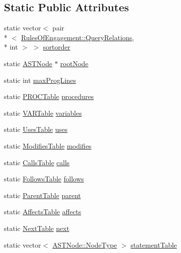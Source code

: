 \subsection*{Static Public Attributes}
\begin{DoxyCompactItemize}
\item 
static vector$<$ pair\\*
$<$ \hyperlink{class_rules_of_engagement_a5e08db2a0638b98dbb06ad923a33d817}{Rules\-Of\-Engagement\-::\-Query\-Relations}, \\*
int $>$ $>$ \hyperlink{class_p_k_b_aa0386fc54ac3aa101697cec565cd97ab}{sortorder}
\item 
static \hyperlink{class_a_s_t_node}{A\-S\-T\-Node} $\ast$ \hyperlink{class_p_k_b_a5978f3d40a8d0bb732ba708440d499b8}{root\-Node}
\item 
static int \hyperlink{class_p_k_b_ae3b310bfb545d59911cd4f6bb54ebd94}{max\-Prog\-Lines}
\item 
static \hyperlink{class_p_r_o_c_table}{P\-R\-O\-C\-Table} \hyperlink{class_p_k_b_ae426b49eef5572e594a3a465e6e462b3}{procedures}
\item 
static \hyperlink{class_v_a_r_table}{V\-A\-R\-Table} \hyperlink{class_p_k_b_a04a10fef1b34afbe28d6e217e7e11d20}{variables}
\item 
static \hyperlink{class_uses_table}{Uses\-Table} \hyperlink{class_p_k_b_aec685879d658ff43471889ddbee175a9}{uses}
\item 
static \hyperlink{class_modifies_table}{Modifies\-Table} \hyperlink{class_p_k_b_acdeea65712ec5e26401bf04ca41fa526}{modifies}
\item 
static \hyperlink{class_calls_table}{Calls\-Table} \hyperlink{class_p_k_b_a7876c3653d636ee8a726941d0f98e3ae}{calls}
\item 
static \hyperlink{class_follows_table}{Follows\-Table} \hyperlink{class_p_k_b_a93dcc37be7f8e851ff4317925c07a9f5}{follows}
\item 
static \hyperlink{class_parent_table}{Parent\-Table} \hyperlink{class_p_k_b_a92894a22bbf3b6e449f30c6bee9f070a}{parent}
\item 
static \hyperlink{class_affects_table}{Affects\-Table} \hyperlink{class_p_k_b_ad9d778faa5c6d938082d07d90da6fea0}{affects}
\item 
static \hyperlink{class_next_table}{Next\-Table} \hyperlink{class_p_k_b_a72e85289ddb59ff230cc7aace31826b5}{next}
\item 
static vector$<$ \hyperlink{class_a_s_t_node_a4fd016b5f0e44ea6aca3542d27de3859}{A\-S\-T\-Node\-::\-Node\-Type} $>$ \hyperlink{class_p_k_b_a295e1559f863827d703055a49a1b888b}{statement\-Table}

\end{DoxyCompactItemize}
